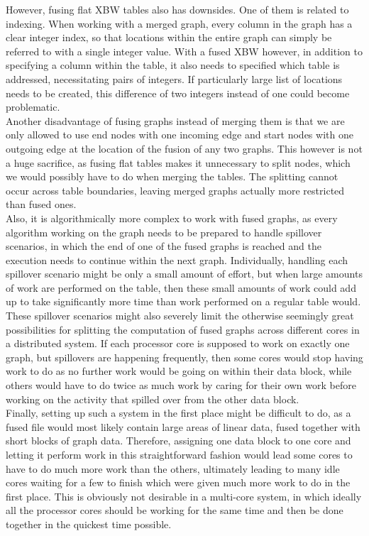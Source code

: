 \documentclass[a4paper,12pt,twoside,BCOR=10mm]{scrbook}
\begin{document}
However, fusing flat XBW tables also has downsides. 
One of them is related to indexing. 
When working with a merged graph, every column in the graph has a clear integer index, 
so that locations within the entire graph can simply be referred to with a single integer value. 
With a fused XBW however, in addition to specifying a column within the table, 
it also needs to specified which table is addressed, necessitating pairs of integers. 
If particularly large list of locations needs to be created, this difference of two integers instead of one 
could become problematic. \\
Another disadvantage of fusing graphs instead of merging them is that we 
are only allowed to use end nodes with one incoming edge and start nodes with one outgoing edge 
at the location of the fusion of any two graphs. 
This however is not a huge sacrifice, as fusing flat tables makes it unnecessary to 
split nodes, which we would possibly have to do when merging the tables. 
The splitting cannot occur across table boundaries, leaving merged graphs 
actually more restricted than fused ones. \\
Also, it is algorithmically more complex to work with fused graphs, as every 
algorithm working on the graph needs to be prepared to handle spillover scenarios, 
in which the end of one of the fused graphs is reached and the execution needs to continue 
within the next graph. 
Individually, handling each spillover scenario might be only a small amount of effort, 
but when large amounts of work are performed on the table, then these small amounts of work 
could add up to take significantly more time than work performed on a regular table would. \\
These spillover scenarios might also severely limit the otherwise seemingly 
great possibilities for splitting the computation of fused graphs across different 
cores in a distributed system. 
If each processor core is supposed to work on exactly one graph, 
but spillovers are happening frequently, then some cores would stop having work 
to do as no further work would be going on within their data block, 
while others would have to do twice as much work by caring for their 
own work before working on the activity that spilled over from the other data block. \\
Finally, setting up such a system in the first place might be difficult to do, 
as a fused file would most likely contain large areas of linear data, 
fused together with short blocks of graph data. Therefore, assigning one 
data block to one core and letting it perform work in this straightforward fashion 
would lead some cores to have to do much more work than the others, ultimately 
leading to many idle cores waiting for a few to finish which were given much more work 
to do in the first place. This is obviously not desirable in a multi-core system, 
in which ideally all the processor cores should be working for the same time 
and then be done together in the quickest time possible.
\end{document}
